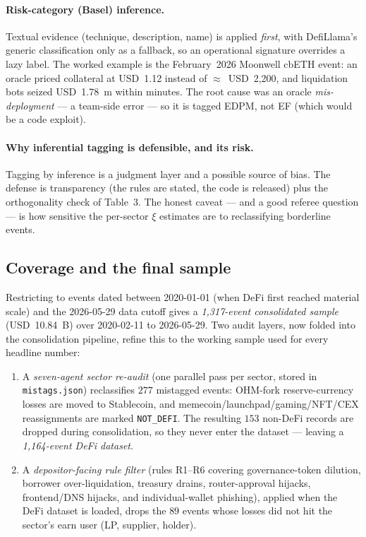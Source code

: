 \documentclass[11pt]{article}
\theoremstyle{definition}
\theoremstyle{remark}
\theoremstyle{definition}
\newcommand{\1}{\mathbf{1}}
\begin{document}
\paragraph{Risk-category (Basel) inference.}
Textual evidence (technique, description, name) is applied \emph{first}, with
DefiLlama's generic classification only as a fallback, so an operational
signature overrides a lazy label. The worked example is the February~2026
Moonwell cbETH event: an oracle priced collateral at USD~1.12 instead of
$\approx$~USD~2{,}200, and liquidation bots seized USD~1.78~m within minutes.
The root cause was an oracle \emph{mis-deployment} --- a team-side error ---
so it is tagged EDPM, not EF (which would be a code exploit).

\paragraph{Why inferential tagging is defensible, and its risk.}
Tagging by inference is a judgment layer and a possible source of bias. The
defense is transparency (the rules are stated, the code is released) plus the
orthogonality check of Table~3. The honest caveat --- and a good referee
question --- is how sensitive the per-sector $\xi$ estimates are to
reclassifying borderline events.

\subsection{Coverage and the final sample}

Restricting to events dated between 2020-01-01 (when DeFi first reached
material scale) and the 2026-05-29 data cutoff gives a
\emph{1{,}317-event consolidated sample} (USD~10.84~B) over
2020-02-11 to 2026-05-29. Two audit layers, now folded into the
consolidation pipeline, refine this to the working sample used for every
headline number:

\begin{enumerate}[leftmargin=1.4em]
\item A \emph{seven-agent sector re-audit} (one parallel pass per sector,
stored in \texttt{mistags.json}) reclassifies $277$ mistagged events:
OHM-fork reserve-currency losses are moved to Stablecoin, and
memecoin/launchpad/gaming/NFT/CEX reassignments are marked \texttt{NOT\_DEFI}.
The resulting $153$ non-DeFi records are dropped during consolidation, so
they never enter the dataset --- leaving a \emph{1{,}164-event DeFi dataset}.

\item A \emph{depositor-facing rule filter} (rules R1--R6 covering
governance-token dilution, borrower over-liquidation, treasury drains,
router-approval hijacks, frontend/DNS hijacks, and individual-wallet
phishing), applied when the DeFi dataset is loaded, drops the $89$ events
whose losses did not hit the sector's earn user (LP, supplier, holder).
\end{enumerate}
\end{document}
